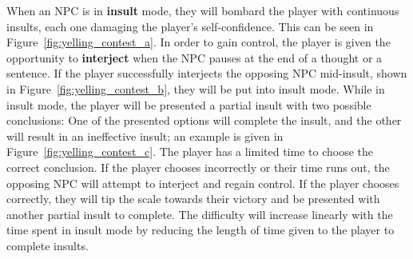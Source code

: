 When an NPC is in \textbf{insult} mode, they will bombard the player with continuous insults, each one damaging the player's self-confidence. This can be seen in Figure~\ref{fig:yelling_contest_a}. In order to gain control, the player is given the opportunity to \textbf{interject} when the NPC pauses at the end of a thought or a sentence. If the player successfully interjects the opposing NPC mid-insult, shown in Figure~\ref{fig:yelling_contest_b}, they will be put into insult mode. While in insult mode, the player will be presented a partial insult with two possible conclusions: One of the presented options will complete the insult, and the other will result in an ineffective insult; an example is given in Figure~\ref{fig:yelling_contest_c}. The player has a limited time to choose the correct conclusion. If the player chooses incorrectly or their time runs out, the opposing NPC will attempt to interject and regain control. If the player chooses correctly, they will tip the scale towards their victory and be presented with another partial insult to complete. The difficulty will increase linearly with the time spent in insult mode by reducing the length of time given to the player to complete insults.

